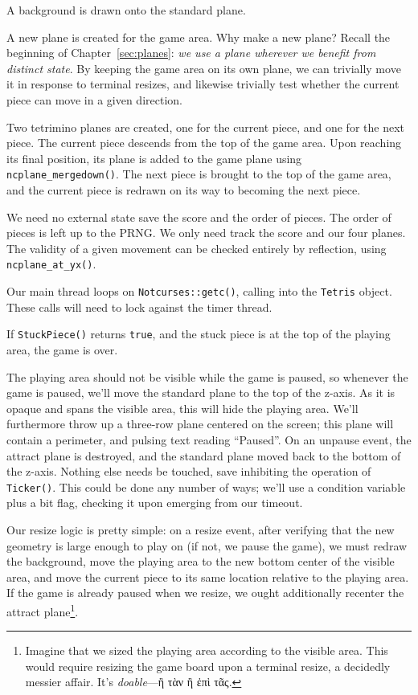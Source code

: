 \begin{denseitemize}
\item{A background is drawn onto the standard plane.}
\item{A new plane is created for the game area. Why make a new plane? Recall
    the beginning of Chapter~\ref{sec:planes}: \textit{we use a plane wherever we
    benefit from distinct state}. By keeping the game area on its own plane,
    we can trivially move it in response to terminal resizes, and likewise
    trivially test whether the current piece can move in a given direction.}
\item{Two tetrimino planes are created, one for the current piece, and one for
    the next piece. The current piece descends from the top of the game area.
    Upon reaching its final position, its plane is added to the game plane
    using \texttt{ncplane\_mergedown()}. The next piece is brought to the top
    of the game area, and the current piece is redrawn on its way to becoming
    the next piece.}
\item{We need no external state save the score and the order of pieces. The order
    of pieces is left up to the PRNG. We only need track the score and
    our four planes. The validity of a given movement can be checked entirely
    by reflection, using \texttt{ncplane\_at\_yx()}.}
\item{Our main thread loops on \texttt{Notcurses::getc()}, calling into the
    \texttt{Tetris} object. These calls will need to lock against the timer thread.}
\item{If \texttt{StuckPiece()} returns \texttt{true}, and the stuck piece
    is at the top of the playing area, the game is over.}
\end{denseitemize}

The playing area should not be visible while the game is paused, so whenever
the game is paused, we'll move the standard plane to the top of the z-axis. As
it is opaque and spans the visible area, this will hide the playing area. We'll
furthermore throw up a three-row plane centered on the screen; this plane will
contain a perimeter, and pulsing text reading ``Paused''. On an unpause event,
the attract plane is destroyed, and the standard plane moved back to the bottom
of the z-axis. Nothing else needs be touched, save inhibiting the operation
of \texttt{Ticker()}. This could be done any number of ways; we'll use a
condition variable plus a bit flag, checking it upon emerging from our timeout.

Our resize logic is pretty simple: on a resize event, after verifying that the
new geometry is large enough to play on (if not, we pause the game), we must
redraw the background, move the playing area to the new bottom center of the
visible area, and move the current piece to its same location relative to the
playing area. If the game is already paused when we resize, we ought
additionally recenter the attract plane\footnote{Imagine that we sized the playing area according to the
visible area. This would require resizing the game board upon a terminal
resize, a decidedly messier affair. It's \textit{doable}---\textgreek{ἢ τὰν ἢ ἐπὶ τᾶς}.}.

